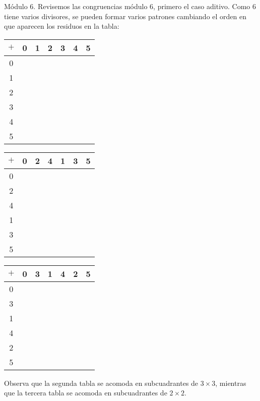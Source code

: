 \begin{ejercicio}
Módulo $6$. Revisemos las congruencias módulo $6$, primero el caso aditivo. Como $6$ tiene varios divisores, se pueden formar varios patrones cambiando el orden en que aparecen los residuos en la tabla:

 \begin{tabular}{|c||c|c|c|c|c|c|} 
 \hline
  $+$ & 0 & 1 & 2 & 3 & 4 & 5\\ 
  \hline
  \hline
  0 &  & & & & & \\ 
  \hline
  1 &  & & & & &\\
    \hline
  2 &  & & & & & \\
      \hline
  3 &  & & & & &\\ 
        \hline
  4 &  & & & & &\\ 
          \hline
  5 &  & & & & &\\ 
  \hline
\end{tabular}
\hspace{.5cm}
 \begin{tabular}{|c||c|c|c|c|c|c|} 
 \hline
  $+$ & 0 & 2 & 4 & 1 & 3 & 5\\ 
  \hline
  \hline
  0 &  & & & & & \\ 
  \hline
  2 &  & & & & &\\
    \hline
  4 &  & & & & & \\
      \hline
  1 &  & & & & &\\ 
        \hline
  3 &  & & & & &\\ 
          \hline
  5 &  & & & & &\\ 
  \hline
\end{tabular}
\hspace{.5cm}
 \begin{tabular}{|c||c|c|c|c|c|c|} 
 \hline
  $+$ & 0 & 3 & 1 & 4 & 2 & 5\\ 
  \hline
  \hline
  0 &  & & & & & \\ 
  \hline
  3 &  & & & & &\\
    \hline
  1 &  & & & & & \\
      \hline
  4 &  & & & & &\\ 
        \hline
  2 &  & & & & &\\ 
          \hline
  5 &  & & & & &\\ 
  \hline
\end{tabular}

Observa que la segunda tabla se acomoda en subcuadrantes de $3\times 3$, mientras que la tercera tabla se acomoda en subcuadrantes de $2\times 2$.


\end{ejercicio}
